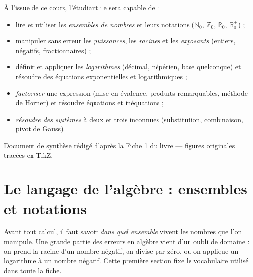 \documentclass[11pt,a4paper]{article}
\newcommand{\R}{\mathbb{R}}
\newcommand{\N}{\mathbb{N}}
\newcommand{\Z}{\mathbb{Z}}
\begin{document}
\begin{tcolorbox}[boxbase,colback=primary!5,colframe=primary,width=15cm,
    title={\textsc{Objectifs pédagogiques de la fiche}}]
À l'issue de ce cours, l'étudiant·e sera capable de :
\begin{itemize}[leftmargin=1.6em,topsep=2pt,itemsep=1pt]
  \item lire et utiliser les \emph{ensembles de nombres} et leurs notations ($\N_0$, $\Z_0$, $\R_0$, $\R_0^+$) ;
  \item manipuler sans erreur les \emph{puissances}, les \emph{racines} et les \emph{exposants} (entiers, négatifs, fractionnaires) ;
  \item définir et appliquer les \emph{logarithmes} (décimal, népérien, base quelconque) et résoudre des équations exponentielles et logarithmiques ;
  \item \emph{factoriser} une expression (mise en évidence, produits remarquables, méthode de Horner) et résoudre équations et inéquations ;
  \item \emph{résoudre des systèmes} à deux et trois inconnues (substitution, combinaison, pivot de Gauss).
\end{itemize}
\end{tcolorbox}

\vspace{0.5cm}
{\small\color{black!60} Document de synthèse rédigé d'après la Fiche 1 du livre — figures originales tracées en TikZ.}
\par
\endgroup

\newpage
\renewcommand{\contentsname}{\textcolor{primarydark}{Table des matières}}
\tableofcontents
\thispagestyle{fancy}
\newpage

\section{Le langage de l'algèbre : ensembles et notations}
Avant tout calcul, il faut savoir \emph{dans quel ensemble} vivent les nombres que l'on manipule.
Une grande partie des erreurs en algèbre vient d'un oubli de domaine : on prend la racine d'un
nombre négatif, on divise par zéro, ou on applique un logarithme à un nombre négatif. Cette
première section fixe le vocabulaire utilisé dans toute la fiche.
\end{document}
